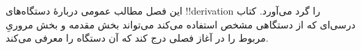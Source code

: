 \documentclass[../../../include/open-logic-chapter]{subfiles}
\begin{document}
      {}
      {}

\begin{editorial}
این فصل مطالب عمومی دربارهٔ دستگاه‌های !!{derivation} را گرد می‌آورد.
کتاب درسی‌ای که از دستگاهی مشخص استفاده می‌کند می‌تواند بخش مقدمه و
بخش مروریِ مربوط را در آغاز فصلی درج کند که آن دستگاه را معرفی می‌کند.
\end{editorial}






\OLEndChapterHook
\end{document}
